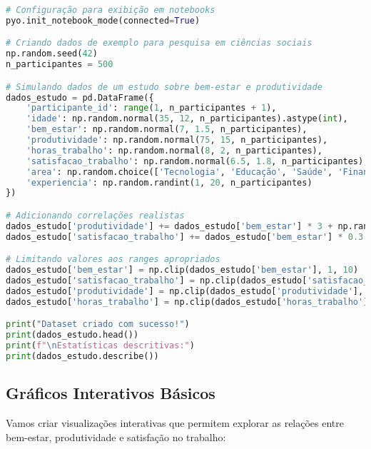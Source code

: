 \begin{pythonbox}
\begin{lstlisting}[language=Python]
# Configuração para exibição em notebooks
pyo.init_notebook_mode(connected=True)

# Criando dados de exemplo para pesquisa em ciências sociais
np.random.seed(42)
n_participantes = 500

# Simulando dados de um estudo sobre bem-estar e produtividade
dados_estudo = pd.DataFrame({
    'participante_id': range(1, n_participantes + 1),
    'idade': np.random.normal(35, 12, n_participantes).astype(int),
    'bem_estar': np.random.normal(7, 1.5, n_participantes),
    'produtividade': np.random.normal(75, 15, n_participantes),
    'horas_trabalho': np.random.normal(8, 2, n_participantes),
    'satisfacao_trabalho': np.random.normal(6.5, 1.8, n_participantes),
    'area': np.random.choice(['Tecnologia', 'Educação', 'Saúde', 'Finanças'], n_participantes),
    'experiencia': np.random.randint(1, 20, n_participantes)
})

# Adicionando correlações realistas
dados_estudo['produtividade'] += dados_estudo['bem_estar'] * 3 + np.random.normal(0, 5, n_participantes)
dados_estudo['satisfacao_trabalho'] += dados_estudo['bem_estar'] * 0.3 + np.random.normal(0, 0.5, n_participantes)

# Limitando valores aos ranges apropriados
dados_estudo['bem_estar'] = np.clip(dados_estudo['bem_estar'], 1, 10)
dados_estudo['satisfacao_trabalho'] = np.clip(dados_estudo['satisfacao_trabalho'], 1, 10)
dados_estudo['produtividade'] = np.clip(dados_estudo['produtividade'], 30, 100)
dados_estudo['horas_trabalho'] = np.clip(dados_estudo['horas_trabalho'], 4, 12)

print("Dataset criado com sucesso!")
print(dados_estudo.head())
print(f"\nEstatísticas descritivas:")
print(dados_estudo.describe())
\end{lstlisting}
\end{pythonbox}

\subsection{Gráficos Interativos Básicos}

\begin{examplebox}
Vamos criar visualizações interativas que permitem explorar as relações entre bem-estar, produtividade e satisfação no trabalho:
\end{examplebox}

